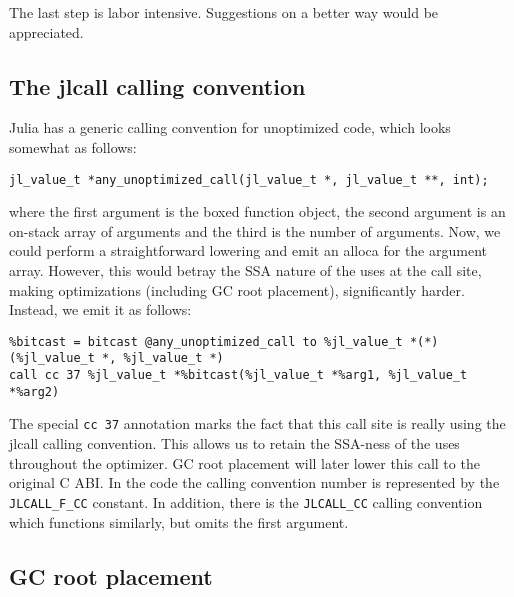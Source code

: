 The last step is labor intensive.  Suggestions on a better way would be appreciated.



\hypertarget{9068676689189894192}{}


\subsection{The jlcall calling convention}



Julia has a generic calling convention for unoptimized code, which looks somewhat as follows:




\begin{lstlisting}
jl_value_t *any_unoptimized_call(jl_value_t *, jl_value_t **, int);
\end{lstlisting}



where the first argument is the boxed function object, the second argument is an on-stack array of arguments and the third is the number of arguments. Now, we could perform a straightforward lowering and emit an alloca for the argument array. However, this would betray the SSA nature of the uses at the call site, making optimizations (including GC root placement), significantly harder. Instead, we emit it as follows:




\begin{lstlisting}
%bitcast = bitcast @any_unoptimized_call to %jl_value_t *(*)(%jl_value_t *, %jl_value_t *)
call cc 37 %jl_value_t *%bitcast(%jl_value_t *%arg1, %jl_value_t *%arg2)
\end{lstlisting}



The special \texttt{cc 37} annotation marks the fact that this call site is really using the jlcall calling convention. This allows us to retain the SSA-ness of the uses throughout the optimizer. GC root placement will later lower this call to the original C ABI. In the code the calling convention number is represented by the \texttt{JLCALL\_F\_CC} constant. In addition, there is the \texttt{JLCALL\_CC} calling convention which functions similarly, but omits the first argument.



\hypertarget{1193214752065867769}{}


\subsection{GC root placement}




